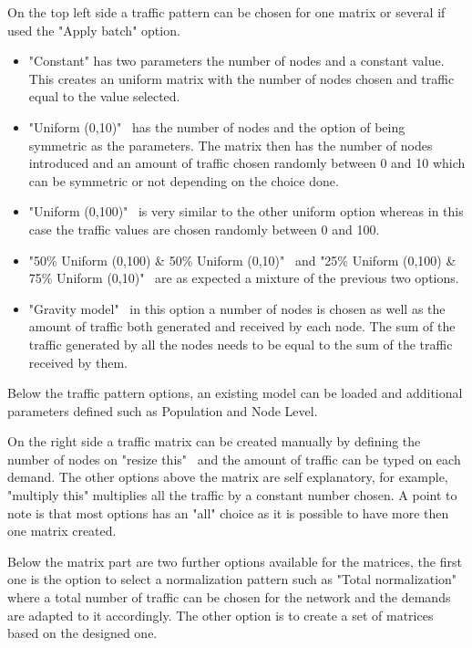 	On the top left side a traffic pattern can be chosen for one matrix or several if used the "Apply batch" option.
	
	\begin{itemize}	
		
		\item{"Constant" has two parameters the number of nodes and a constant value. This creates an uniform matrix with the number of nodes chosen and traffic equal to the value selected.}
	
		\item{"Uniform (0,10)" \, has the number of nodes and the option of being symmetric as the parameters. The matrix then has the number of nodes introduced and an amount of traffic chosen randomly between 0 and 10 which can be symmetric or not depending on the choice done.}
	
		\item{"Uniform (0,100)" \, is very similar to the other uniform option whereas in this case the traffic values are chosen randomly between 0 and 100.}
	
		\item{"50\% Uniform (0,100) \& 50\% Uniform (0,10)" \, and "25\% Uniform (0,100) \& 75\% Uniform (0,10)" \, are as expected a mixture of the previous two options.}
	
		\item{"Gravity model" \, in this option a number of nodes is chosen as well as the amount of traffic both generated and received by each node. The sum of the traffic generated by all the nodes needs to be equal to the sum of the traffic received by them. }

	\end{itemize}
	
	Below the traffic pattern options, an existing model can be loaded and additional parameters defined such as Population and Node Level.
	
	On the right side a traffic matrix can be created manually by defining the number of nodes on "resize this" \, and the amount of traffic can be typed on each demand. The other options above the matrix are self explanatory, for example, "multiply this" multiplies all the traffic by a constant number chosen. A point to note is that most options has an "all" choice as it is possible to have more then one matrix created.
	
	Below the matrix part are two further options available for the matrices, the first one is the option to select a normalization pattern such as "Total normalization" where a total number of traffic can be chosen for the network and the demands are adapted to it accordingly. The other option is to create a set of matrices based on the designed one.\\
	

